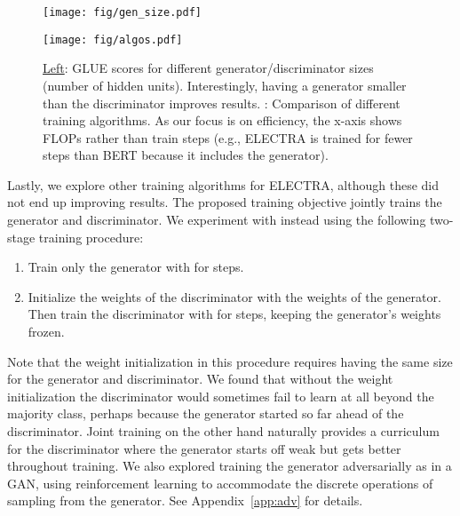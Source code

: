\documentclass{article}
\newcommand{\xhdr}[1]{\vspace{0mm}\noindent{{\bf #1}}\hspace{1.3mm}}
\begin{document}
\begin{figure}[tb]
\begin{center}
\begin{minipage}[c]{0.55\textwidth}
\texttt{[image: fig/gen\_size.pdf]}
\end{minipage}
\hspace{4mm}
\begin{minipage}[c]{0.4\textwidth}
\texttt{[image: fig/algos.pdf]}
\end{minipage}
\end{center}
\caption{\underline{Left}: GLUE scores for different generator/discriminator sizes (number of hidden units). Interestingly, having a generator smaller than the discriminator improves results.
\underline{}: Comparison of different training algorithms. As our focus is on efficiency, the x-axis shows FLOPs rather than train steps (e.g., ELECTRA is trained for fewer steps than BERT because it includes the generator).}
\label{fig:extensions}
\end{figure}


\xhdr{Training Algorithms}
Lastly, we explore other training algorithms for ELECTRA, although these did not end up improving results.
The proposed training objective jointly trains the generator and discriminator. We experiment with instead using the following two-stage training procedure:
\begin{enumerate}
    \vspace{-1mm}
    \item Train only the generator with  for  steps.
    \vspace{-0.3mm}
    \item Initialize the weights of the discriminator with the weights of the generator. Then train the discriminator with  for  steps, keeping the generator's weights frozen.
    \vspace{-1mm}
\end{enumerate}
Note that the weight initialization in this procedure requires having the same size for the generator and discriminator.
We found that without the weight initialization the discriminator would sometimes fail to learn at all beyond the majority class, perhaps because the generator started so far ahead of the discriminator. 
Joint training on the other hand naturally provides a curriculum for the discriminator where the generator starts off weak but gets better throughout training.
We also explored training the generator adversarially as in a GAN, using reinforcement learning to accommodate the discrete operations of sampling from the generator. See Appendix~\ref{app:adv} for details. 
\end{document}
